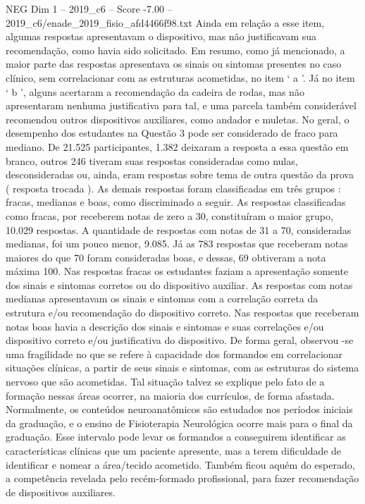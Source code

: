 \begin{textsample}{NEG Dim 1 – 2019\_c6 – Score -7.00 – 2019\_c6/enade\_2019\_fisio\_afd4466f98.txt}
Ainda em relação a esse item, algumas respostas apresentavam o dispositivo, mas não justificavam sua recomendação, como havia sido solicitado.
Em resumo, como já mencionado, a maior parte das respostas apresentava os sinais ou sintomas presentes no caso clínico, sem correlacionar com as estruturas acometidas, no item ‘ a ’.
Já no item ‘ b ’, alguns acertaram a recomendação da cadeira de rodas, mas não apresentaram nenhuma justificativa para tal, e uma parcela também considerável recomendou outros dispositivos auxiliares, como andador e muletas.
No geral, o desempenho dos estudantes na Questão 3 pode ser considerado de fraco para mediano.
De 21.525 participantes, 1.382 deixaram a resposta a essa questão em branco, outros 246 tiveram suas respostas consideradas como nulas, desconsideradas ou, ainda, eram respostas sobre tema de outra questão da prova ( resposta trocada ).
As demais respostas foram classificadas em três grupos : fracas, medianas e boas, como discriminado a seguir.
As respostas classificadas como fracas, por receberem notas de zero a 30, constituíram o maior grupo, 10.029 respostas.
A quantidade de respostas com notas de 31 a 70, consideradas medianas, foi um pouco menor, 9.085.
Já as 783 respostas que receberam notas maiores do que 70 foram consideradas boas, e dessas, 69 obtiveram a nota máxima 100.
Nas respostas fracas os estudantes faziam a apresentação somente dos sinais e sintomas corretos ou do dispositivo auxiliar.
As respostas com notas medianas apresentavam os sinais e sintomas com a correlação correta da estrutura e/ou recomendação do dispositivo correto.
Nas respostas que receberam notas boas havia a descrição dos sinais e sintomas e suas correlações e/ou dispositivo correto e/ou justificativa do dispositivo.
De forma geral, observou -se uma fragilidade no que se refere à capacidade dos formandos em correlacionar situações clínicas, a partir de seus sinais e sintomas, com as estruturas do sistema nervoso que são acometidas.
Tal situação talvez se explique pelo fato de a formação nessas áreas ocorrer, na maioria dos currículos, de forma afastada.
Normalmente, os conteúdos neuroanatômicos são estudados nos períodos iniciais da graduação, e o ensino de Fisioterapia Neurológica ocorre mais para o final da graduação.
Esse intervalo pode levar os formandos a conseguirem identificar as características clínicas que um paciente apresente, mas a terem dificuldade de identificar e nomear a área/tecido acometido.
Também ficou aquém do esperado, a competência revelada pelo recém-formado profissional, para fazer recomendação de dispositivos auxiliares.

\end{textsample}
